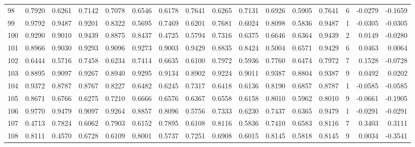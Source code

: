 \begin{tabular}{lrrrrrrrrrrrrrrr}
98  &      0.7920 &  0.6261 &  0.7142 &  0.7078 &  0.6546 &  0.6178 &  0.7641 &  0.6265 &  0.7131 &  0.6926 &   0.5905 &     0.7641 &      6 &                   -0.0279 &                    -0.1659 \\
99  &      0.9792 &  0.9487 &  0.9201 &  0.8322 &  0.5695 &  0.7469 &  0.6201 &  0.7681 &  0.6024 &  0.8098 &   0.5836 &     0.9487 &      1 &                   -0.0305 &                    -0.0305 \\
100 &      0.9290 &  0.9010 &  0.9439 &  0.8875 &  0.8437 &  0.4725 &  0.5794 &  0.7316 &  0.6375 &  0.6646 &   0.6364 &     0.9439 &      2 &                    0.0149 &                    -0.0280 \\
101 &      0.8966 &  0.9030 &  0.9293 &  0.9096 &  0.9273 &  0.9003 &  0.9429 &  0.8835 &  0.8424 &  0.5004 &   0.6571 &     0.9429 &      6 &                    0.0463 &                     0.0064 \\
102 &      0.6444 &  0.5716 &  0.7458 &  0.6234 &  0.7414 &  0.6635 &  0.6100 &  0.7972 &  0.5936 &  0.7760 &   0.6474 &     0.7972 &      7 &                    0.1528 &                    -0.0728 \\
103 &      0.8895 &  0.9097 &  0.9267 &  0.8940 &  0.9295 &  0.9134 &  0.8902 &  0.9224 &  0.9011 &  0.9387 &   0.8804 &     0.9387 &      9 &                    0.0492 &                     0.0202 \\
104 &      0.9372 &  0.8787 &  0.8767 &  0.8227 &  0.6482 &  0.6245 &  0.7317 &  0.6418 &  0.6136 &  0.8190 &   0.6857 &     0.8787 &      1 &                   -0.0585 &                    -0.0585 \\
105 &      0.8671 &  0.6766 &  0.6275 &  0.7210 &  0.6666 &  0.6576 &  0.6367 &  0.6558 &  0.6158 &  0.8010 &   0.5962 &     0.8010 &      9 &                   -0.0661 &                    -0.1905 \\
106 &      0.9770 &  0.9479 &  0.9097 &  0.9264 &  0.8857 &  0.8096 &  0.5756 &  0.7333 &  0.6230 &  0.7437 &   0.6365 &     0.9479 &      1 &                   -0.0291 &                    -0.0291 \\
107 &      0.4713 &  0.7824 &  0.6062 &  0.7903 &  0.6152 &  0.7895 &  0.6108 &  0.8116 &  0.5836 &  0.7410 &   0.6583 &     0.8116 &      7 &                    0.3403 &                     0.3111 \\
108 &      0.8111 &  0.4570 &  0.6728 &  0.6109 &  0.8001 &  0.5737 &  0.7251 &  0.6908 &  0.6015 &  0.8145 &   0.5818 &     0.8145 &      9 &                    0.0034 &                    -0.3541 \\

\end{tabular}
